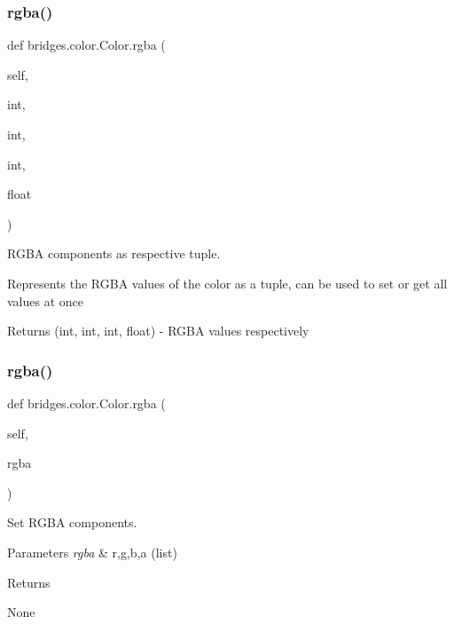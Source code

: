 \subsubsection{\texorpdfstring{rgba()}{rgba()}\hspace{0.1cm}{\footnotesize\ttfamily [1/2]}}
{\footnotesize\ttfamily def bridges.\+color.\+Color.\+rgba (\begin{DoxyParamCaption}\item[{}]{self,  }\item[{}]{int,  }\item[{}]{int,  }\item[{}]{int,  }\item[{}]{float }\end{DoxyParamCaption})}



R\+G\+BA components as respective tuple. 

Represents the R\+G\+BA values of the color as a tuple, can be used to set or get all values at once \begin{DoxyReturn}{Returns}
(int, int, int, float) -\/ R\+G\+BA values respectively 
\end{DoxyReturn}
\mbox{\label{classbridges_1_1color_1_1_color_aa3d8dcfea52715f28400b08bf15e94ab}} 
\subsubsection{\texorpdfstring{rgba()}{rgba()}\hspace{0.1cm}{\footnotesize\ttfamily [2/2]}}
{\footnotesize\ttfamily def bridges.\+color.\+Color.\+rgba (\begin{DoxyParamCaption}\item[{}]{self,  }\item[{}]{rgba }\end{DoxyParamCaption})}



Set R\+G\+BA components. 


\begin{DoxyParams}{Parameters}
{\em rgba} & r,g,b,a (list) \\
\hline
\end{DoxyParams}
\begin{DoxyReturn}{Returns}


None 
\end{DoxyReturn}
\mbox{\label{classbridges_1_1color_1_1_color_a99b17a81feb1737f8b29c93ae9ef4bc8}} 
